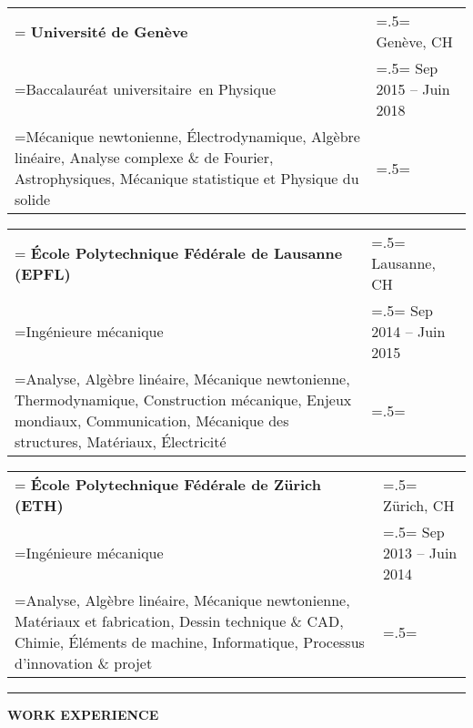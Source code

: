 \documentclass[letterpaper, 11pt]{article}
\begin{document}
\begin{tabularx}{1.0\textwidth} { 
   >{\raggedright\arraybackslash\hsize=1.5\hsize\linewidth=\hsize}X 
   >{\raggedleft\arraybackslash\hsize=.5\hsize\linewidth=\hsize}X }
\normalsize
\bf{Université de Genève} & Genève, CH \\
\normalfont Baccalauréat universitaire\ en Physique & Sep 2015 -- Juin 2018  \\  
Mécanique newtonienne, Électrodynamique, Algèbre linéaire, Analyse complexe \& de Fourier, Astrophysiques, Mécanique statistique et Physique du solide &
\end{tabularx}
\vspace{0.25cm}

\begin{tabularx}{1.0\textwidth} { 
   >{\raggedright\arraybackslash\hsize=1.5\hsize\linewidth=\hsize}X 
   >{\raggedleft\arraybackslash\hsize=.5\hsize\linewidth=\hsize}X }
\normalsize
\bf{École Polytechnique Fédérale de Lausanne (EPFL)} & Lausanne, CH \\
\normalfont Ingénieure mécanique & Sep 2014 -- Juin 2015\\
Analyse, Algèbre linéaire, Mécanique newtonienne, Thermodynamique, 
Construction mécanique, Enjeux mondiaux, Communication, Mécanique des structures, Matériaux, Électricité
\end{tabularx}
\vspace{0.25cm}

\begin{tabularx}{1.0\textwidth} { 
   >{\raggedright\arraybackslash\hsize=1.5\hsize\linewidth=\hsize}X 
   >{\raggedleft\arraybackslash\hsize=.5\hsize\linewidth=\hsize}X }
\normalsize
\bf{École Polytechnique Fédérale de Zürich (ETH)} & Zürich, CH \\
\normalfont Ingénieure mécanique & Sep 2013 -- Juin 2014 \\
Analyse, Algèbre linéaire, Mécanique newtonienne, Matériaux et fabrication, Dessin technique \& CAD, Chimie, Éléments de machine, Informatique, Processus d'innovation \& projet
\end{tabularx}
\vspace{0.25cm}

\begin{center}
\noindent\rule{0.75\textwidth}{1pt}
\end{center}

\begin{center}
\large\bf{WORK EXPERIENCE}
\end{center}
\end{document}
